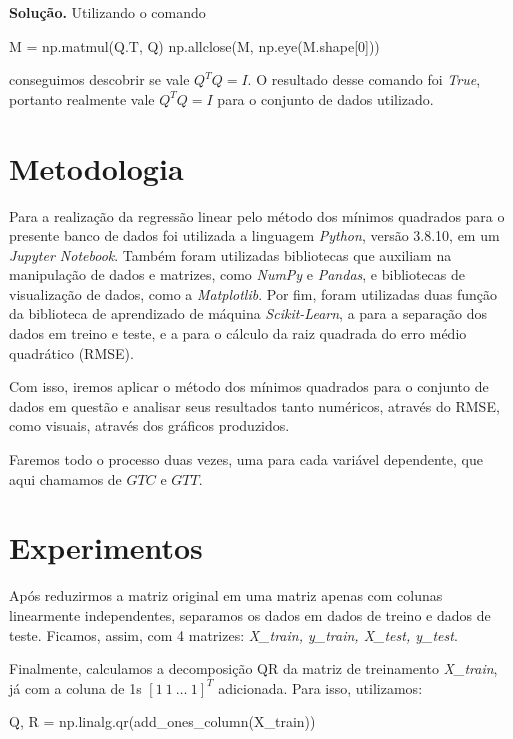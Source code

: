 \documentclass[a4paper, 12pt]{article}
\theoremstyle{definition}
\newenvironment{solucao}{\noindent\textbf{Solução.}}{}
\theoremstyle{remark}
\begin{document}
\begin{solucao}
    Utilizando o comando
    \begin{python}
M = np.matmul(Q.T, Q)
np.allclose(M, np.eye(M.shape[0]))
    \end{python}
conseguimos descobrir se vale $Q^TQ = I$. O resultado desse comando foi \textit{True}, portanto realmente vale $Q^TQ = I$ para o conjunto de dados utilizado.
\end{solucao}

\newpage
\section{Metodologia}

Para a realização da regressão linear pelo método dos mínimos quadrados para o presente banco de dados foi utilizada a linguagem \textit{Python}, versão 3.8.10, em um \textit{Jupyter Notebook}. Também foram utilizadas bibliotecas que auxiliam na manipulação de dados e matrizes, como \textit{NumPy} e \textit{Pandas}, e bibliotecas de visualização de dados, como a \textit{Matplotlib}. Por fim, foram utilizadas duas função da biblioteca de aprendizado de máquina \textit{Scikit-Learn}, a  para a separação dos dados em treino e teste, e a  para o cálculo da raiz quadrada do erro médio quadrático (RMSE).

Com isso, iremos aplicar o método dos mínimos quadrados para o conjunto de dados em questão e analisar seus resultados tanto numéricos, através do RMSE, como visuais, através dos gráficos produzidos.

Faremos todo o processo duas vezes, uma para cada variável dependente, que aqui chamamos de $GTC$ e $GTT$.

\newpage
\section{Experimentos}

Após reduzirmos a matriz original em uma matriz apenas com colunas linearmente independentes, separamos os dados em dados de treino e dados de teste. Ficamos, assim, com 4 matrizes: \textit{X\_train, y\_train, X\_test, y\_test}.
    
Finalmente, calculamos a decomposição QR da matriz de treinamento \textit{X\_train}, já com a coluna de 1s $[1\ 1\ \ldots\ 1]^T$ adicionada. Para isso, utilizamos:
    
\begin{python}
Q, R = np.linalg.qr(add_ones_column(X_train))
\end{python}
    
\end{document}
